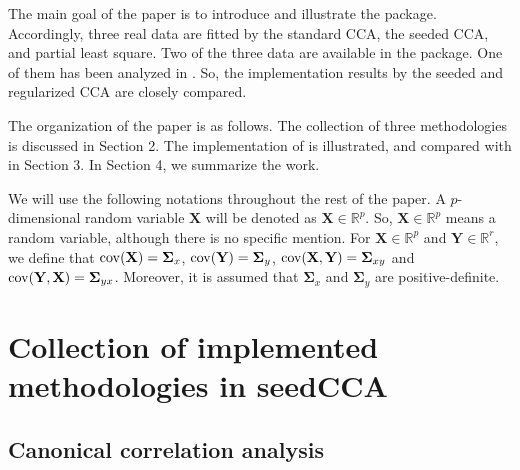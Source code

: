 The main goal of the paper is to introduce and illustrate
the  package.
Accordingly, three real data are fitted by the standard CCA,
the seeded CCA, and partial least square. 
Two of the three data are available in the package.
One of them has been analyzed in \cite{ecca}.
So, the implementation results by the seeded and regularized CCA
are closely compared.

The organization of the paper is as follows.
The collection of three methodologies is discussed in Section 2.
The implementation of  is illustrated, 
and compared with  in Section 3.
In Section 4, we summarize the work.

We will use the following notations throughout the rest of the paper.
A $p$-dimensional random variable $\mathbf{X}$
will be denoted as $\mathbf{X}\in\mathbb{R}^{p}$.
So, $\mathbf{X}\in\mathbb{R}^{p}$ means a random variable,
although there is no specific mention.
For $\mathbf{X} \in \mathbb{R}^p$ and $\mathbf{Y} \in \mathbb{R}^r$,
we define that ${\rm cov}(\mathbf{X})={\boldsymbol \Sigma}_x$,
${\rm cov}({\mathbf{Y}})={\boldsymbol \Sigma}_y$,
${\rm cov}(\mathbf{X,Y})={\boldsymbol \Sigma}_{xy}$ and
${\rm cov}(\mathbf{Y,X})= {\boldsymbol\Sigma}_{yx}$.
Moreover, it is assumed that ${\boldsymbol \Sigma}_x$ and ${\boldsymbol \Sigma}_y$
are positive-definite.


\section{Collection of implemented methodologies in \textsf{seedCCA}}

\subsection{Canonical correlation analysis}

